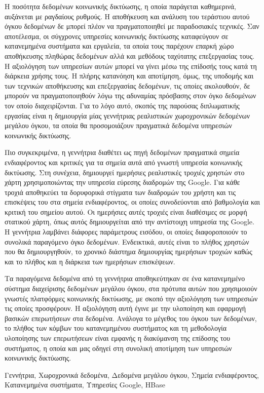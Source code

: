 
\begin{abstractgr}%

Η ποσότητα δεδομένων κοινωνικής δικτύωσης, η οποία παράγεται καθημερινά, αυξάνεται με ραγδαίους ρυθμούς. Η αποθήκευση και ανάλυση του τεράστιου αυτού όγκου δεδομένων 
δε μπορεί πλέον να πραγματοποιηθεί με παραδοσιακές τεχνικές. Σαν αποτέλεσμα, οι σύγχρονες υπηρεσίες κοινωνικής δικτύωσης καταφεύγουν σε κατανεμημένα συστήματα και εργαλεία, 
τα οποία τους παρέχουν επαρκή χώρο αποθήκευσης πληθώρας δεδομένων αλλά και μεθόδους ταχύτατης \linebreak επεξεργασίας τους. Η αξιολόγηση των υπηρεσίων αυτών μπορεί να γίνει 
μέσω της επίδοσής τους κατά τη διάρκεια χρήσης τους. Η πλήρης κατανόηση και αποτίμηση, όμως, της υποδομής και των τεχνικών αποθήκευσης και επεξεργασίας δεδομένων, τις 
οποίες ακολουθούν, δε μπορούν να πραγματοποιηθούν λόγω της αδυναμίας πρόσβασης στον όγκο δεδομένων τον οποίο διαχειρίζονται. Για το λόγο αυτό, σκοπός της 
παρούσας διπλωματικής εργασίας είναι η δημιουργία μίας γεννήτριας ρεαλιστικών χωροχρονικών δεδομένων μεγάλου όγκου, τα οποία θα προσομοιάζουν πραγματικά δεδομένα 
υπηρεσιών κοινωνικής δικτύωσης. 

Πιο συγκεκριμένα, η γεννήτρια διαθέτει ως πηγή δεδομένων πραγματικά σημεία ενδιαφέροντος και κριτικές για τα σημεία αυτά από γνωστή υπηρεσία κοινωνικής δικτύωσης. 
Στη συνέχεια, δημιουργεί ημερήσιες ρεαλιστικές τροχιές χρηστών στο χάρτη χρησιμοποιώντας την υπηρεσία εύρεσης διαδρομών της Google. Για κάθε τροχιά αποθηκεύει 
τα δορυφορικά στίγματα των \linebreak διαδρομών του χρήστη και τις επισκέψεις του στα σημεία ενδιαφέροντος, οι οποίες συνοδεύονται από βαθμολογία και κριτική του σημείου αυτού. 
Οι ημερήσιες αυτές τροχιές είναι διαθέσιμες σε μορφή στατικού χάρτη, όπως αυτός δημιουργείται από την αντίστοιχη υπηρεσία της Google. Η γεννήτρια λαμβάνει διάφορες 
παράμετρους εισόδου, οι οποίες διαφοροποιούν το συνολικά παραγόμενο όγκο δεδομένων. Ενδεικτικά, αυτές είναι το πλήθος χρηστών που θα δημιουργηθούν, το 
χρονικό διάστημα δημιουργίας ημερήσιων τροχιών καθώς και το πλήθος και η διάρκεια των ημερήσιων επισκέψεων. 

Τα παραγόμενα δεδομένα από τη γεννήτρια αποθηκεύτηκαν σε ένα κατανεμημένο σύστημα διαχείρισης δεδομένων μεγάλου όγκου, στα πρότυπα αυτών που χρησιμοιούν γνωστές 
πλατφόρμες κοινωνικής δικτύωσης, με σκοπό την αξιολόγηση των υπηρεσιών τις οποίες προσφέρουν. Η αξιολόγηση αυτή έγινε με την υλοποίηση και εφαρμογή 
βασικών επερωτήσεων στα δεδομένα. 
Ανάλογα το μέγεθος του όγκου των δεδομένων, το πλήθος των κόμβων του κατανεμημένου συστήματος και τη μεθοδολογία υλοποίησης των 
επερωτήσεων είναι εμφανής η διακύμανση της επίδοσης του συστήματος, η οποία και μας οδηγεί στη συνολική αποτίμηση των υπηρεσιών κοινωνικής δικτύωσης. 


  \begin{keywordsgr}
  Γεννήτρια, Χωροχρονικά δεδομένα, Δεδομένα μεγάλου όγκου, Σημεία ενδιαφέροντος, \linebreak Κατανεμημένα συστήματα, Υπηρεσίες Google, HBase
  \end{keywordsgr}
\end{abstractgr}
